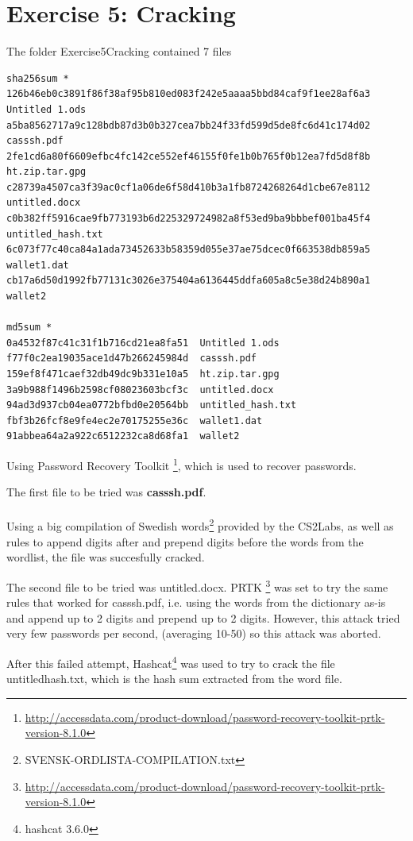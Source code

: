 \documentclass[a4paper,10pt,oneside]{article}
\begin{document}
\section{Exercise 5: Cracking }
The folder Exercise5\textunderscore Cracking contained 7 files
\begin{lstlisting}[caption=Content of Exercise5\textunderscore Cracking folder]
sha256sum *
126b46eb0c3891f86f38af95b810ed083f242e5aaaa5bbd84caf9f1ee28af6a3  Untitled 1.ods
a5ba8562717a9c128bdb87d3b0b327cea7bb24f33fd599d5de8fc6d41c174d02  casssh.pdf
2fe1cd6a80f6609efbc4fc142ce552ef46155f0fe1b0b765f0b12ea7fd5d8f8b  ht.zip.tar.gpg
c28739a4507ca3f39ac0cf1a06de6f58d410b3a1fb8724268264d1cbe67e8112  untitled.docx
c0b382ff5916cae9fb773193b6d225329724982a8f53ed9ba9bbbef001ba45f4  untitled_hash.txt
6c073f77c40ca84a1ada73452633b58359d055e37ae75dcec0f663538db859a5  wallet1.dat
cb17a6d50d1992fb77131c3026e375404a6136445ddfa605a8c5e38d24b890a1  wallet2

md5sum *
0a4532f87c41c31f1b716cd21ea8fa51  Untitled 1.ods
f77f0c2ea19035ace1d47b266245984d  casssh.pdf
159ef8f471caef32db49dc9b331e10a5  ht.zip.tar.gpg
3a9b988f1496b2598cf08023603bcf3c  untitled.docx
94ad3d937cb04ea0772bfbd0e20564bb  untitled_hash.txt
fbf3b26fcf8e9fe4ec2e70175255e36c  wallet1.dat
91abbea64a2a922c6512232ca8d68fa1  wallet2
\end{lstlisting}
Using Password Recovery Toolkit \footnote{\url{http://accessdata.com/product-download/password-recovery-toolkit-prtk-version-8.1.0}}, which is used to recover passwords.

The first file to be tried was \textbf{casssh.pdf}.\\\\
Using a big compilation of Swedish words\footnote{SVENSK-ORDLISTA-COMPILATION.txt} provided by the CS2Labs, as well as rules to append digits after and prepend digits before the words from the wordlist, the file was succesfully cracked.

The second file to be tried was untitled.docx. PRTK \footnote{\url{http://accessdata.com/product-download/password-recovery-toolkit-prtk-version-8.1.0}}
was set to try the same rules that worked for casssh.pdf, i.e. using the words from the dictionary as-is and append up to 2 digits and prepend up to 2 digits. However, this attack tried very few passwords per second, (averaging 10-50) so this attack was aborted.

After this failed attempt, Hashcat\footnote{hashcat 3.6.0} was used to try to crack the file untitled\textunderscore hash.txt, which is the hash sum extracted from the word file.
\end{document}
